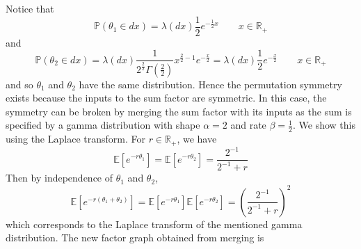 \begin{enumerate}
\begin{solution}
Notice that
\[
\mathbb{P}(\theta_1\in dx) = \lambda(dx)\frac{1}{2}e^{-\frac{1}{2}x} \qquad x\in\mathbb{R}_+
\]
and
\[
\mathbb{P}(\theta_2\in dx) = \lambda(dx)\frac{1}{2^{\frac{2}{2}}\Gamma\left(\frac{2}{2}\right)}x^{\frac{2}{2}-1}e^{-\frac{x}{2}} = \lambda(dx)\frac{1}{2}e^{-\frac{x}{2}} \qquad x\in\mathbb{R}_+
\]
and so $\theta_1$ and $\theta_2$ have the same distribution. Hence the permutation symmetry exists because the inputs to the sum factor are symmetric. In this case, the symmetry can be broken by merging the sum factor with its inputs as the sum is specified by a gamma distribution with shape $\alpha=2$ and rate $\beta=\frac{1}{2}$. We show this using the Laplace transform. For $r\in\mathbb{R}_+$, we have
\[
\mathbb{E}[e^{-r\theta_1}] = \mathbb{E}[e^{-r\theta_2}] = \frac{2^{-1}}{2^{-1}+r}
\]
Then by independence of $\theta_1$ and $\theta_2$,
\[
\mathbb{E}[e^{-r(\theta_1+\theta_2)}] = \mathbb{E}[e^{-r\theta_1}]\mathbb{E}[e^{-r\theta_2}] = \left(\frac{2^{-1}}{2^{-1}+r}\right)^2
\]
which corresponds to the Laplace transform of the mentioned gamma distribution. The new factor graph obtained from merging is

\begin{figure}[h]
\begin{center}
\end{center}
\end{figure}
\end{solution}

\end{enumerate}